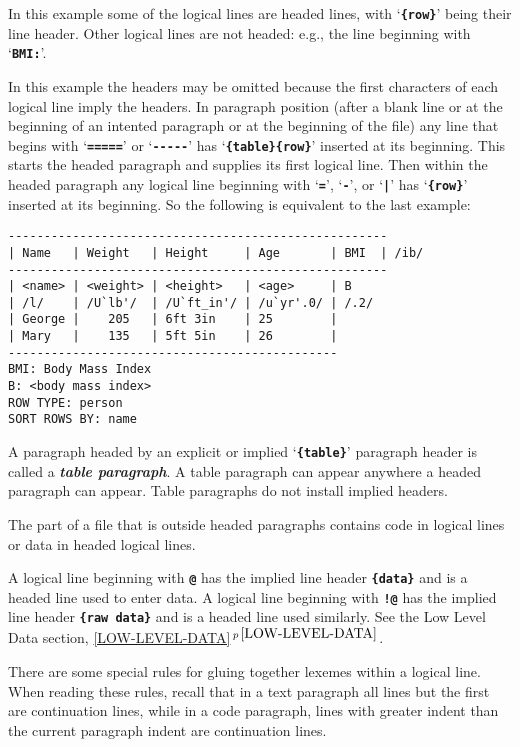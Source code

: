 \documentclass[12pt]{article}
\newcommand{\TT}[1]{{\tt \bfseries #1}}
\newcommand{\key}[1]{{\bf \em #1}\index{#1}}
\newcommand{\itemref}[1]{\ref{#1}$\,^{p\,\pageref{#1}}$}
\newenvironment{indpar}[1][0.3in]%
	{\begin{list}{}%
		     {\setlength{\itemsep}{0in}%
		      \setlength{\topsep}{0in}%
		      \setlength{\parsep}{1ex}%
		      \setlength{\labelwidth}{#1}%
		      \setlength{\leftmargin}{#1}%
		      \addtolength{\leftmargin}{\labelsep}}%
	 \item}%
	{\end{list}}
\begin{document}
In this example some of the logical lines are headed lines,
with `\TT{\{row\}}' being their line header.
Other logical lines are not headed: e.g., the line beginning
with `\TT{BMI:}'.

In this example the headers may be omitted because
the first characters of each logical line imply the headers.
In paragraph position (after a blank line or at the beginning
of an intented paragraph or at the beginning of the file)
any line that begins with `\TT{=====}' or `\TT{-{}-{}-{}-{}-}'
has `\TT{\{table\}\{row\}}' inserted at its beginning.  This
starts the headed paragraph and supplies its first logical
line.  Then within the headed paragraph any logical line
beginning with `\TT{=}', `\TT{-}', or `\TT{|}' has
`\TT{\{row\}}' inserted at its beginning.  So the following
is equivalent to the last example:
\begin{indpar}\begin{verbatim}
-----------------------------------------------------
| Name   | Weight   | Height     | Age       | BMI  | /ib/
-----------------------------------------------------
| <name> | <weight> | <height>   | <age>     | B
| /l/    | /U`lb'/  | /U`ft_in'/ | /u`yr'.0/ | /.2/
| George |    205   | 6ft 3in    | 25        |
| Mary   |    135   | 5ft 5in    | 26        |
----------------------------------------------
BMI: Body Mass Index
B: <body mass index>
ROW TYPE: person
SORT ROWS BY: name
\end{verbatim}\end{indpar}

A paragraph headed by an explicit or implied 
`\TT{\{table\}}' paragraph header is called a \key{table paragraph}.
A table paragraph can appear anywhere a headed paragraph can appear.
Table paragraphs do not install implied headers.

The part of a file that is outside headed paragraphs contains code in
logical lines or data in headed logical lines.

A logical line beginning with \TT{@}\label{DATA-ENTRY-LINE}
has the implied line header
\TT{\{data\}} and is a headed line used to enter data.
A logical line beginning with \TT{!@} has the implied line header
\TT{\{raw data\}} and is a headed line used similarly.
See the Low Level Data section, \itemref{LOW-LEVEL-DATA}.

There are some special rules for gluing together lexemes within
a logical line.  When reading these rules, recall that in a text
paragraph all lines but the first are continuation lines, while
in a code paragraph, lines with greater indent than the current paragraph
indent are continuation lines.
\end{document}

